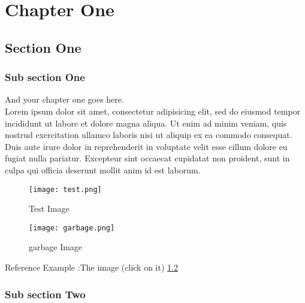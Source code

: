 \chapter{Chapter One}%
\label{chap:chapter_one}

\section{Section One}
\label{chap:section_one}

  \subsection{Sub section One}

  And your chapter one goes here\cite{web001}\@. ~\\
  Lorem ipsum dolor sit amet, consectetur adipisicing elit, sed do eiusmod
  tempor incididunt ut labore et dolore magna aliqua. Ut enim ad minim veniam,
  quis nostrud exercitation ullamco laboris nisi ut aliquip ex ea commodo
  consequat. Duis aute irure dolor in reprehenderit in voluptate velit esse
  cillum dolore eu fugiat nulla pariatur. Excepteur sint occaecat cupidatat non
  proident, sunt in culpa qui officia deserunt mollit anim id est laborum.

  \begin{figure}[H]%
    \center%
    \texttt{[image: test.png]}%
    \caption[This is a test image]{Test Image}\label{fig:test}%
  \end{figure}
  
   \begin{figure}[H]%
    \center%
    \texttt{[image: garbage.png]}%
    \caption[This is a test image]{garbage Image}\label{fig:garbage}%
  \end{figure}

Reference Example :The image (click on it) \ref{fig:garbage} 

  \subsection{Sub section Two}

